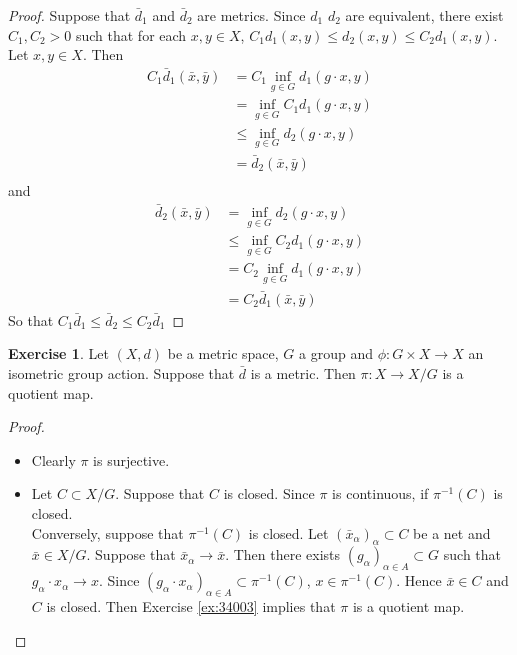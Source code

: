 \documentclass[12pt]{amsart}
\theoremstyle{definition}
\newtheorem{ex}[definition]{Exercise}
\newcommand{\al}{\alpha}
\newcommand{\rex}[1]{Exercise \ref{ex:#1}}
\begin{document}
	\begin{proof} Suppose that $\bar{d}_1$ and $\bar{d}_2$  are metrics. Since $d_1$ $d_2$ are equivalent, there exist $C_1, C_2 >0$ such that for each $x,y \in X$, $C_1d_1(x,y) \leq d_2(x,y) \leq C_2d_1(x,y)$. Let $x,y \in X$. Then
	\begin{align*}
	C_1\bar{d}_1(\bar{x}, \bar{y}) 
	&= C_1 \inf_{g \in G} d_1(g \cdot x, y) \\
	&=  \inf_{g \in G} C_1 d_1(g \cdot x, y) \\
	&\leq \inf_{g \in G} d_2(g \cdot x, y) \\
	&= \bar{d}_2(\bar{x}, \bar{y}) \\
	\end{align*}	 
	and 
	\begin{align*}
	\bar{d}_2(\bar{x}, \bar{y}) 
	&= \inf_{g \in G} d_2(g \cdot x, y) \\	
	& \leq \inf_{g \in G} C_2 d_1(g \cdot x, y) \\
	&= C_2 \inf_{g \in G}  d_1(g \cdot x, y) \\
	&= C_2 \bar{d}_1(\bar{x}, \bar{y})
	\end{align*}
	So that $C_1 \bar{d}_1 \leq \bar{d}_2 \leq C_2 \bar{d}_1$
	\end{proof}
	
	\begin{ex}
	Let $(X,d)$ be a metric space, $G$ a group and $\phi: G \times X \rightarrow X$ an isometric group action. Suppose that $\bar{d}$ is a metric. Then $\pi:X \rightarrow X/G$ is a quotient map.
	\end{ex}
	
	\begin{proof}\
	\begin{itemize}
	\item Clearly $\pi$ is surjective. 
	\item Let $C \subset X/G$. Suppose that $C$ is closed. Since $\pi$ is continuous, if $\pi^{-1}(C)$ is closed. \\
	Conversely, suppose that $\pi^{-1}(C)$ is closed. Let $(\bar{x}_{\al})_{\al} \subset C$ be a net and $\bar{x} \in X/G$. Suppose that $\bar{x}_{\al} \rightarrow \bar{x}$. Then there exists $(g_{\al})_{\al \in A} \subset G$ such that $g_{\al} \cdot x_{\al} \rightarrow x$. Since $(g_{\al} \cdot x_{\al})_{\al \in A} \subset \pi^{-1}(C)$, $x \in \pi^{-1}(C)$. Hence $\bar{x} \in C$ and $C$ is closed. Then \rex{34003} implies that $\pi$ is a quotient map.
	\end{itemize}
	\end{proof}
	
\end{document}
